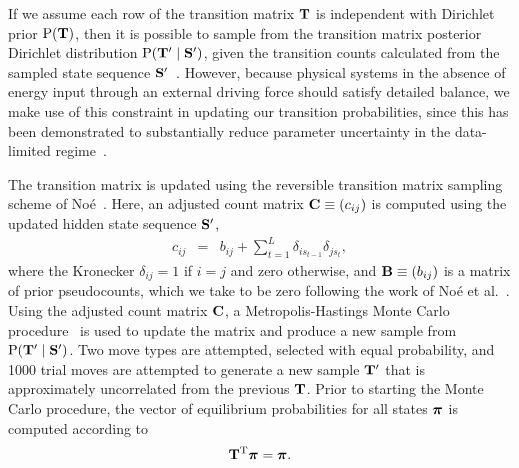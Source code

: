 \documentclass[aps,pre,twocolumn,superscriptaddress,nofootinbib,longbibliography]{revtex4-1}
\newcommand{\bfv}[1]{{\mbox{\boldmath{$#1$}}}}
\newcommand{\bfm}[1]{{\bf #1}}
\renewcommand{\Pr}{\mathrm{P}}
\newcommand{\T}{\mathrm{T}}                                %
\begin{document}
{%
{\color{red} If we assume each row of the transition matrix $\bfm{T}$ is independent with Dirichlet prior $\Pr(\bfm{T})$, then it is possible to sample from the transition matrix posterior Dirichlet distribution $\Pr(\bfm{T}' \mid \bfm{S}')$, given the transition counts calculated from the sampled state sequence $\bfm{S}'$~\cite{noe:jcp:2008:transition-matrix-sampling}.}
However, because physical systems in the absence of energy input through an external driving force should satisfy detailed balance, we make use of this constraint in updating our transition probabilities, since this has been demonstrated to substantially reduce parameter uncertainty in the data-limited regime~\cite{noe:jcp:2008:transition-matrix-sampling}.

The transition matrix is updated using the reversible transition matrix sampling scheme of No\'{e}~\cite{noe:jcp:2008:transition-matrix-sampling,chodera-noe:jcp:2011:observable-sampling}.
Here, an adjusted count matrix $\bfm{C} \equiv (c_{ij})$ is computed using the updated hidden state sequence $\bfm{S}'$,
\begin{eqnarray}
c_{ij} &=& b_{ij} +\sum_{t=1}^{L} \delta_{is_{t-1}} \delta_{js_{t}} ,
\end{eqnarray}
where the Kronecker $\delta_{ij} = 1$ if $i = j$ and zero otherwise, and $\bfm{B} \equiv (b_{ij})$ is a matrix of prior pseudocounts, which we take to be zero following the work of No\'{e} et al.~\cite{noe:pnas:2009:ww-domain}.
Using the adjusted count matrix $\bfm{C}$, a Metropolis-Hastings Monte Carlo procedure~\cite{metropolis-hastings} is used to update the matrix and produce a new sample from $\Pr(\bfm{T}' \mid \bfm{S}')$.
Two move types are attempted, selected with equal probability, and 1000 trial moves are attempted to generate a new sample $\bfm{T}'$ that is approximately uncorrelated from the previous $\bfm{T}$.
Prior to starting the Monte Carlo procedure, the vector of equilibrium probabilities for all states $\bfv{\pi}$ is computed according to 
\begin{eqnarray}
\bfm{T}^\T \bfv{\pi} = \bfv{\pi} .
\end{eqnarray}

}
\end{document}
